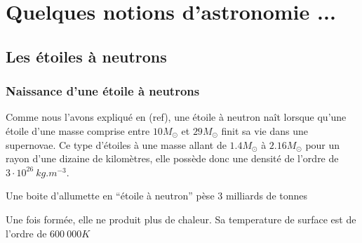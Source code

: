 \documentclass[11pt]{book} %
\begin{document}
\usechapterimagefalse%


\pagestyle{empty} %

\tableofcontents %

\cleardoublepage%

\pagestyle{fancy} %





\chapter{Quelques notions d'astronomie ...}


\section{Les étoiles à neutrons}

\subsection{Naissance d'une étoile à neutrons}
Comme nous l'avons expliqué en (ref), une étoile à neutron naît lorsque qu'une étoile d'une masse comprise entre \(10M_\odot\) et \(29M_\odot\) finit sa vie dans une supernovae. Ce type d'étoiles à une masse allant de \(1.4M_\odot\) à \(2.16M_\odot\) pour un rayon d'une dizaine de kilomètres, elle possède donc une densité de l'ordre de \(3\cdot 10^{26}\ kg.m^{-3}\).
\begin{remark}
    Une boite d'allumette en ``étoile à neutron'' pèse 3 milliards de tonnes
\end{remark}
Une fois formée, elle ne produit plus de chaleur. Sa temperature de surface est de l'ordre de \(600\ 000K\)
\end{document}
